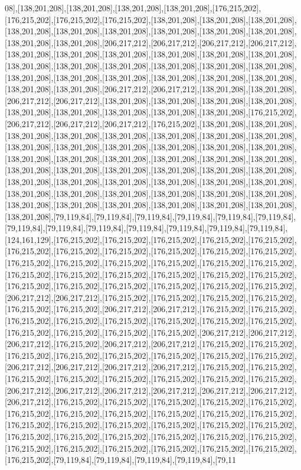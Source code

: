 08],[138,201,208],[138,201,208],[138,201,208],[138,201,208],[176,215,202],[176,215,202],[176,215,202],[176,215,202],[138,201,208],[138,201,208],[138,201,208],[138,201,208],[138,201,208],[138,201,208],[138,201,208],[138,201,208],[138,201,208],[138,201,208],[138,201,208],[206,217,212],[206,217,212],[206,217,212],[206,217,212],[138,201,208],[138,201,208],[138,201,208],[138,201,208],[138,201,208],[138,201,208],[138,201,208],[138,201,208],[138,201,208],[138,201,208],[138,201,208],[138,201,208],[138,201,208],[138,201,208],[138,201,208],[138,201,208],[138,201,208],[138,201,208],[138,201,208],[138,201,208],[206,217,212],[206,217,212],[138,201,208],[138,201,208],[206,217,212],[206,217,212],[138,201,208],[138,201,208],[138,201,208],[138,201,208],[138,201,208],[138,201,208],[138,201,208],[138,201,208],[138,201,208],[176,215,202],[206,217,212],[206,217,212],[206,217,212],[176,215,202],[138,201,208],[138,201,208],[138,201,208],[138,201,208],[138,201,208],[138,201,208],[138,201,208],[138,201,208],[138,201,208],[138,201,208],[138,201,208],[138,201,208],[138,201,208],[138,201,208],[138,201,208],[138,201,208],[138,201,208],[138,201,208],[138,201,208],[138,201,208],[138,201,208],[138,201,208],[138,201,208],[138,201,208],[138,201,208],[138,201,208],[138,201,208],[138,201,208],[138,201,208],[138,201,208],[138,201,208],[138,201,208],[138,201,208],[138,201,208],[138,201,208],[138,201,208],[138,201,208],[138,201,208],[138,201,208],[138,201,208],[138,201,208],[138,201,208],[138,201,208],[138,201,208],[138,201,208],[79,119,84],[79,119,84],[79,119,84],[79,119,84],[79,119,84],[79,119,84],[79,119,84],[79,119,84],[79,119,84],[79,119,84],[79,119,84],[79,119,84],[79,119,84],[124,161,129],[176,215,202],[176,215,202],[176,215,202],[176,215,202],[176,215,202],[176,215,202],[176,215,202],[176,215,202],[176,215,202],[176,215,202],[176,215,202],[176,215,202],[176,215,202],[176,215,202],[176,215,202],[176,215,202],[176,215,202],[176,215,202],[176,215,202],[176,215,202],[176,215,202],[176,215,202],[176,215,202],[176,215,202],[176,215,202],[176,215,202],[176,215,202],[176,215,202],[176,215,202],[206,217,212],[206,217,212],[176,215,202],[176,215,202],[176,215,202],[176,215,202],[176,215,202],[176,215,202],[206,217,212],[206,217,212],[176,215,202],[176,215,202],[176,215,202],[176,215,202],[176,215,202],[176,215,202],[176,215,202],[176,215,202],[176,215,202],[176,215,202],[176,215,202],[176,215,202],[206,217,212],[206,217,212],[206,217,212],[176,215,202],[206,217,212],[206,217,212],[176,215,202],[176,215,202],[176,215,202],[176,215,202],[176,215,202],[176,215,202],[176,215,202],[176,215,202],[206,217,212],[206,217,212],[206,217,212],[206,217,212],[176,215,202],[176,215,202],[176,215,202],[176,215,202],[176,215,202],[176,215,202],[176,215,202],[176,215,202],[206,217,212],[206,217,212],[206,217,212],[206,217,212],[206,217,212],[206,217,212],[206,217,212],[176,215,202],[176,215,202],[176,215,202],[176,215,202],[176,215,202],[176,215,202],[176,215,202],[176,215,202],[176,215,202],[176,215,202],[176,215,202],[176,215,202],[176,215,202],[176,215,202],[176,215,202],[176,215,202],[176,215,202],[176,215,202],[176,215,202],[176,215,202],[176,215,202],[176,215,202],[176,215,202],[176,215,202],[176,215,202],[176,215,202],[176,215,202],[176,215,202],[176,215,202],[176,215,202],[79,119,84],[79,119,84],[79,119,84],[79,119,84],[79,11